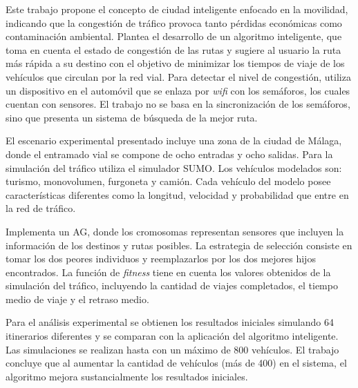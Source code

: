 \begin{itemize}
\begin{item}

Este trabajo propone el concepto de ciudad inteligente enfocado en la movilidad, indicando que la congestión de tráfico provoca tanto pérdidas económicas como contaminación ambiental. Plantea el desarrollo de un algoritmo inteligente, que toma en cuenta el estado de congestión de las rutas y sugiere al usuario la ruta más rápida a su destino con el objetivo de minimizar los tiempos de viaje de los vehículos que circulan por la red vial. Para detectar el nivel de congestión, utiliza un dispositivo en el automóvil que se enlaza por \emph{wifi} con los semáforos, los cuales cuentan con sensores. El trabajo no se basa en la sincronización de los semáforos, sino que presenta un sistema de búsqueda de la mejor ruta.

El escenario experimental presentado incluye una zona de la ciudad de Málaga, donde el entramado vial se compone de ocho entradas y ocho salidas. Para la simulación del tráfico utiliza el simulador SUMO. Los vehículos modelados son: turismo, monovolumen, furgoneta y camión. Cada vehículo del modelo posee características diferentes como la longitud, velocidad y probabilidad que entre en la red de tráfico.

Implementa un AG, donde los cromosomas representan sensores que incluyen la información de los destinos y rutas posibles. La estrategia de selección consiste en tomar los dos peores individuos y reemplazarlos por los dos mejores hijos encontrados. La función de \emph{fitness} tiene en cuenta los valores obtenidos de la simulación del tráfico, incluyendo la cantidad de viajes completados, el tiempo medio de viaje y el retraso medio. 

Para el análisis experimental se obtienen los resultados iniciales simulando 64 itinerarios diferentes y se comparan con la aplicación del algoritmo inteligente. Las simulaciones se realizan hasta con un máximo de 800 vehículos. El trabajo concluye que al aumentar la cantidad de vehículos (más de 400) en el sistema, el algoritmo mejora sustancialmente los resultados iniciales.

\end{item}	


\begin{item}


\end{item}
\end{itemize}
